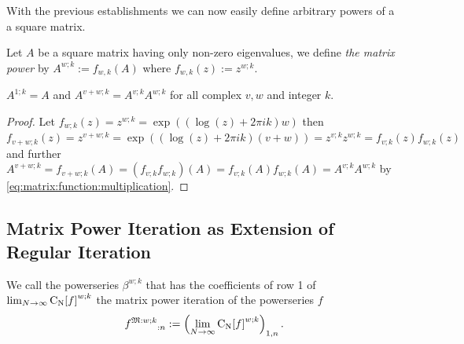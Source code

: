 \documentclass{article}
\numberwithin{equation}{section}
\begin{document}
With the previous establishments we can now easily define arbitrary
powers of a a square matrix. 

\begin{definition}
  Let $A$ be a square matrix having only non-zero eigenvalues, we define
  {\em the matrix power} by $A^{w;k}:=f_{w,k}(A)$ where $f_{w,k}(z):=z^{w;k}$.
\end{definition}
\begin{proposition}\label{prop:matrixpower:exponents}
  $A^{1;k}=A$ and $A^{v+w;k} = A^{v;k} A^{w;k}$ for all complex $v,w$ and integer $k$.
\end{proposition}
\begin{proof}
  Let $f_{w;k}(z)=z^{w;k}=\exp(({\log}(z)+2\pi i k)w)$ then
  $f_{v+w;k}(z)=z^{v+w;k}=\exp((\log(z)+2\pi i k)(v+w))=z^{v;k}
  z^{w;k}=f_{v;k}(z)f_{w;k}(z)$ and
  further
  $A^{v+w;k}=f_{v+w;k}(A)=(f_{v;k}f_{w;k})(A)=f_{v;k}(A)f_{w;k}(A)=A^{v;k}A^{w;k}$
  by \eqref{eq:matrix:function:multiplication}.
\end{proof}
\subsection{Matrix Power Iteration as Extension of Regular Iteration}

\newcommand{\matit}[3]{{#1}^{\mathfrak{M}#2:#3}}
\newcommand{\matitO}[2]{{#1}^{\mathfrak{M}:#2}}
\begin{definition}
  We call the powerseries $\beta^{w;k}$ that has the coefficients of row 1
  of $\lim_{N\to\infty} {\carlt{f}{N}}^{w;k}$ the matrix power
  iteration of the powerseries $f$
  \begin{align}
    \label{eq:matrixpoweriteration}
    {\matitO{f}{w;k}}_{:n} := \left(\lim_{N\to\infty}
      {\carlt{f}{N}}^{w;k}\right)_{1,n}
  .\end{align}
\end{definition}

\end{document}
